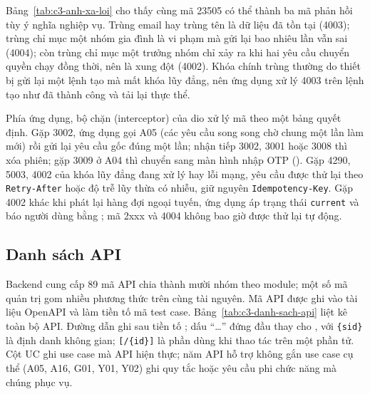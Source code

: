 Bảng~\ref{tab:c3-anh-xa-loi} cho thấy cùng mã 23505 có thể thành ba mã phản hồi tùy ý nghĩa nghiệp vụ. Trùng email hay trùng tên là dữ liệu đã tồn tại (4003); trùng chỉ mục một nhóm gia đình là vi phạm  mà gửi lại bao nhiêu lần vẫn sai (4004); còn trùng chỉ mục một trưởng nhóm chỉ xảy ra khi hai yêu cầu chuyển quyền chạy đồng thời, nên là xung đột (4002). Khóa chính trùng thường do thiết bị gửi lại một lệnh tạo mà mất khóa lũy đẳng, nên ứng dụng xử lý 4003 trên lệnh tạo như đã thành công và tải lại thực thể.

Phía ứng dụng, bộ chặn (interceptor) của dio xử lý mã theo một bảng quyết định. Gặp 3002, ứng dụng gọi A05 (các yêu cầu song song chờ chung một lần làm mới) rồi gửi lại yêu cầu gốc đúng một lần; nhận tiếp 3002, 3001 hoặc 3008 thì xóa phiên; gặp 3009 ở A04 thì chuyển sang màn hình nhập OTP (). Gặp 4290, 5003, 4002 của khóa lũy đẳng đang xử lý hay lỗi mạng, yêu cầu được thử lại theo \texttt{Retry-After} hoặc độ trễ lũy thừa có nhiễu, giữ nguyên \texttt{Idempotency-Key}. Gặp 4002 khác khi phát lại hàng đợi ngoại tuyến, ứng dụng áp trạng thái \texttt{current} và báo người dùng bằng ; mã 2xxx và 4004 không bao giờ được thử lại tự động.

\subsection{Danh sách API}\label{ssec:danh-sach-api}

Backend cung cấp 89 mã API chia thành mười nhóm theo module; một số mã quản trị gom nhiều phương thức trên cùng tài nguyên. Mã API được ghi vào tài liệu OpenAPI và làm tiền tố mã test case. Bảng~\ref{tab:c3-danh-sach-api} liệt kê toàn bộ API. Đường dẫn ghi sau tiền tố ; dấu “\ldots” đứng đầu thay cho , với \texttt{\{sid\}} là định danh không gian; \texttt{[/\{id\}]} là phần dùng khi thao tác trên một phần tử. Cột UC ghi use case mà API hiện thực; năm API hỗ trợ không gắn use case cụ thể (A05, A16, G01, Y01, Y02) ghi quy tắc hoặc yêu cầu phi chức năng mà chúng phục vụ.

